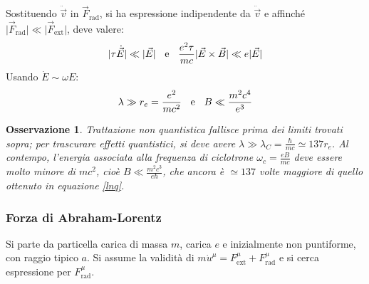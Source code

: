 \documentclass[10pt, a4paper]{scrartcl}
\numberwithin{equation}{subsection}
\theoremstyle{style1}
\newtheorem{osservazione}{Osservazione}[section]
\begin{document}
Sostituendo $\ddot{\vec{v}}$ in $\vec{F}_\text{rad}$, si ha espressione indipendente da $\ddot{\vec{v}}$ e affinch\'e $\lvert \vec{F}_\text{rad} \rvert \ll \lvert \vec{F}_\text{ext} \rvert $, deve valere:
\[
	|\tau \dot{\vec{E}}|  \ll |\vec{E}| \hspace{.2cm} \text{ e } \hspace{.2cm} \frac{e^2 \tau }{mc} |\vec{E}\times \vec{B}| \ll e|\vec{E}|
\] 
Usando $\dot{E}\sim\omega E$:
\begin{equation}\label{lnq}
	\lambda \gg r_e = \frac{e^2 }{mc^2} \hspace{.2cm} \text{ e }\hspace{.2cm} B \ll \frac{m^2 c^4}{e^3}
\end{equation}
\begin{osservazione}
	Trattazione non quantistica fallisce prima dei limiti trovati sopra; per trascurare effetti quantistici, si deve avere $\lambda \gg \lambda _C = \frac{\hbar }{mc}\simeq 137 r_e$. Al contempo, l'energia associata alla frequenza di ciclotrone $\omega _c = \frac{eB}{mc}$ deve essere molto minore di $mc^2$, cio\`e $B \ll \frac{m^2 c^3}{e \hbar }$, che ancora \`e $\simeq 137$ volte maggiore di quello ottenuto in equazione \ref{lnq}.
\end{osservazione}
\subsubsection{Forza di Abraham-Lorentz}
Si parte da particella carica di massa $m$, carica $e$ e inizialmente non puntiforme, con raggio tipico $a$. Si assume la validit\`a di $m\dot{u}^\mu  = F^\mu _\text{ext} + F^\mu  _\text{rad}$ e si cerca espressione per $F^\mu _\text{rad}$.
\end{document}
